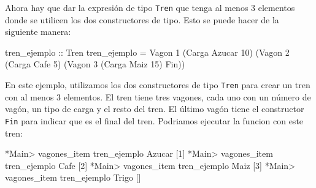 \documentclass{article}
\begin{document}
Ahora hay que dar la expresión de tipo \texttt{Tren} que tenga al menos 3 elementos donde se utilicen los dos constructores de tipo. Esto se puede hacer de la siguiente manera:
\begin{haskell}
tren_ejemplo :: Tren
tren_ejemplo = Vagon 1 (Carga Azucar 10) (Vagon 2 (Carga Cafe 5) (Vagon 3 (Carga Maiz 15) Fin))
\end{haskell}
En este ejemplo, utilizamos los dos constructores de tipo \texttt{Tren} para crear un tren con al menos 3 elementos. El tren tiene tres vagones, cada uno con un número de vagón, un tipo de carga y el resto del tren. El último vagón tiene el constructor \texttt{Fin} para indicar que es el final del tren.
Podriamos ejecutar la funcion con este tren:
\begin{haskell}
*Main> vagones_item tren_ejemplo Azucar
[1]
*Main> vagones_item tren_ejemplo Cafe
[2]
*Main> vagones_item tren_ejemplo Maiz
[3]
*Main> vagones_item tren_ejemplo Trigo
[]
\end{haskell}

\newpage
\end{document}
